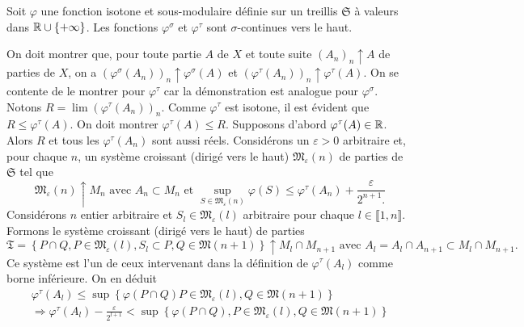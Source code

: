 \begin{thmn}\label{Theor:ContEnvlp}
 Soit $\varphi$ une fonction isotone et sous-modulaire définie sur un treillis $\mathfrak{S}$ à valeurs dans $\mathbb{R}\cup \left\lbrace + \infty \right\rbrace$. Les fonctions $\varphi^\sigma$ et $\varphi^\tau$ sont $\sigma$-continues vers le haut.
\end{thmn}
\begin{demo}
On doit montrer que, pour toute partie $A$ de $X$ et toute suite $(A_n)_n\uparrow A$ de parties de $X$, on a $(\varphi^\sigma(A_n))_n\uparrow \varphi^\sigma(A)$ et $(\varphi^\tau(A_n))_n\uparrow \varphi^\tau(A)$.\newline
On se contente de le montrer pour $\varphi^\tau$ car la démonstration est analogue pour $\varphi^\sigma$. Notons $R = \lim (\varphi^\tau(A_n))_n$. Comme $\varphi^\tau$ est isotone, il est évident que $R \leq \varphi^\tau(A)$. On doit montrer $\varphi^\tau(A) \leq R$.\newline
Supposons d'abord $\varphi^\tau(A) \in \mathbb{R}$. Alors $R$ et tous les $\varphi^\tau(A_n)$ sont aussi réels. Considérons un $\varepsilon > 0$ arbitraire et, pour chaque $n$, un système croissant (dirigé vers le haut) $\mathfrak{M}_\varepsilon(n)$ de parties de $\mathfrak{S}$ tel que
\begin{displaymath}
 \mathfrak{M}_\varepsilon(n)\uparrow M_n \text{ avec } A_n \subset M_n \text{ et } \sup_{S \in \mathfrak{M}_\varepsilon(n)}\varphi(S) \leq \varphi^\tau(A_n) + \frac{\varepsilon}{2^{n+1}.}
\end{displaymath}
Considérons $n$ entier arbitraire et $S_l \in \mathfrak{M}_\varepsilon(l)$ arbitraire pour chaque $l \in \llbracket 1,n \rrbracket$. Formons le système croissant (dirigé vers le haut) de parties
\begin{displaymath}
 \mathfrak{T} = \left\lbrace P \cap Q, P \in \mathfrak{M}_\varepsilon(l), S_l \subset  P,  Q \in \mathfrak{M}(n+1) \right\rbrace \uparrow M_l \cap M_{n+1} \text{ avec } A_l = A_l \cap A_{n+1} \subset M_l \cap M_{n+1}.
\end{displaymath}
Ce système est l'un de ceux intervenant dans la définition de $\varphi^\tau(A_l)$ comme borne inférieure. On en déduit
\begin{multline*}
 \varphi^\tau(A_l) \leq \sup\left\lbrace \varphi(P \cap Q) P \in \mathfrak{M}_\varepsilon(l), Q \in \mathfrak{M}(n+1) \right\rbrace \\
 \Rightarrow
 \varphi^\tau(A_l) - \frac{\varepsilon}{2^{l+1}} < \sup\left\lbrace \varphi(P \cap Q), P \in \mathfrak{M}_\varepsilon(l), Q \in \mathfrak{M}(n+1) \right\rbrace \\

\end{multline*}
\end{demo}
